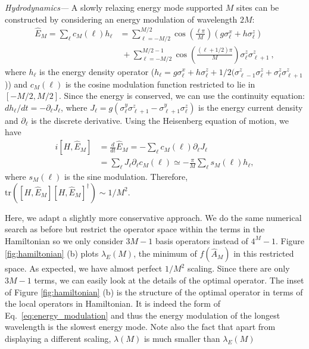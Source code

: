 \documentclass[twocolumn,superscriptaddress, prl,showpacs]{revtex4-1}
\begin{document}
{\it Hydrodynamics---}
A slowly relaxing energy mode supported $M$ sites can be constructed by considering an energy modulation of wavelength $2M$:
\begin{align}
\hat{E}_M = \sum_\ell c_M(\ell) h_\ell
&= \sum_{\ell=-M/2}^{M/2} \cos\left(\frac{\ell\pi}{M}\right)(g \sigma^x_\ell + h\sigma^z_\ell)\nonumber\\
&\;+ \sum_{\ell=-M/2}^{M/2-1} \cos\left(\frac{(\ell+1/2)\pi}{M}\right)\sigma^z_\ell\sigma^z_{\ell+1} ~,
\label{eq:energy_modulation}
\end{align}
where $h_\ell$ is the energy density operator ($h_\ell = g \sigma^x_\ell + h\sigma^z_\ell + 1/2(\sigma^z_{\ell-1}\sigma^z_\ell + \sigma^z_\ell\sigma^z_{\ell+1}$))
and $c_M(\ell)$ is the cosine modulation function restricted to lie in $[-M/2,M/2]$.
Since the energy is conserved, we can use the continuity equation:
$d h_\ell/dt = -\partial_\ell J_\ell$, where  
$J_\ell = g(\sigma^y_\ell \sigma^z_{\ell+1} - \sigma^y_{\ell+1} \sigma^z_\ell)$ 
is the energy current density and $\partial_\ell$ is the discrete derivative.
Using the Heisenberg equation of motion, we have 
\begin{align}
 i[H,\hat{E}_M] &= \frac{d}{dt} \hat{E}_M = -\sum_\ell c_M(\ell) \partial_\ell J_\ell \\
 &= \sum_\ell J_\ell \partial_\ell c_M(\ell) \simeq -\frac{\pi}{M} \sum_\ell s_M(\ell) h_\ell,
\end{align}
where $s_M(\ell)$ is the sine modulation.
Therefore, $\mathrm{tr}([H,\hat{E}_M][H,\hat{E}_M]^\dag) \sim 1/M^2$.

Here, we adapt a slightly more conservative approach.
We do the same numerical search as before but restrict the operator space within the terms in the Hamiltonian
so we only consider $3M-1$ basis operators instead of $4^M-1$.
Figure \ref{fig:hamiltonian} (b) plots $\lambda_E(M)$, the minimum of $f(\hat{A}_M)$ in this restricted space.
As expected, we have almost perfect $1/M^2$ scaling.
Since there are only $3M-1$ terms, we can easily look at the details of the optimal operator.
The inset of Figure \ref{fig:hamiltonian} (b) is the structure of the optimal operator in terms of the local operators in Hamiltonian.
It is indeed the form of Eq.~\eqref{eq:energy_modulation} and thus the energy modulation of the longest wavelength is the slowest energy mode.
Note also the fact that apart from displaying a different scaling, $\lambda(M)$ is much smaller than $\lambda_E(M)$
\end{document}
